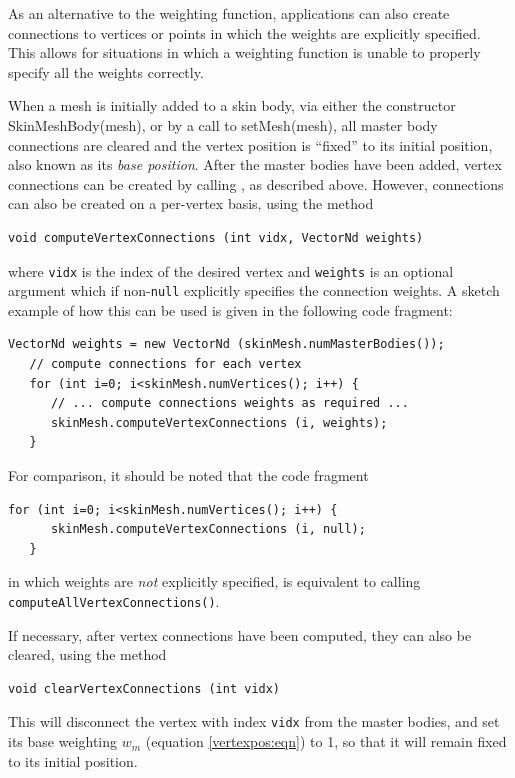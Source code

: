 As an alternative to the weighting function, applications can also
create connections to vertices or points in which the weights are
explicitly specified. This allows for situations in which a weighting
function is unable to properly specify all the weights correctly.

When a mesh is initially added to a skin body, via either the
constructor
%
{SkinMeshBody(mesh)},
or by a call to
%
{setMesh(mesh)},
all master body connections are cleared and the vertex position is
``fixed'' to its initial position, also known as its {\it base
position}. After the master bodies have been added, vertex connections
can be created by calling
,
as described above. However, connections can also be created on a
per-vertex basis, using the method
%
\begin{lstlisting}[]
  void computeVertexConnections (int vidx, VectorNd weights)
\end{lstlisting}
%
where {\tt vidx} is the index of the desired vertex and {\tt weights}
is an optional argument which if non-{\tt null} explicitly specifies
the connection weights. A sketch example of how this can be used is
given in the following code fragment:
%
\begin{lstlisting}[]
   VectorNd weights = new VectorNd (skinMesh.numMasterBodies());
   // compute connections for each vertex
   for (int i=0; i<skinMesh.numVertices(); i++) {
      // ... compute connections weights as required ...
      skinMesh.computeVertexConnections (i, weights);
   }
\end{lstlisting}
%
For comparison, it should be noted that the code fragment
\begin{lstlisting}[]
   for (int i=0; i<skinMesh.numVertices(); i++) {
      skinMesh.computeVertexConnections (i, null);
   }
\end{lstlisting}
in which weights are {\it not} explicitly specified, is
equivalent to calling {\tt computeAllVertexConnections()}.

If necessary, after vertex connections have been computed, they can
also be cleared, using the method
%
\begin{lstlisting}[]
  void clearVertexConnections (int vidx)
\end{lstlisting}
%
This will disconnect the vertex with index {\tt vidx} from the master
bodies, and set its base weighting $w_m$ (equation
\ref{vertexpos:eqn}) to 1, so that it will remain fixed to its initial
position.

